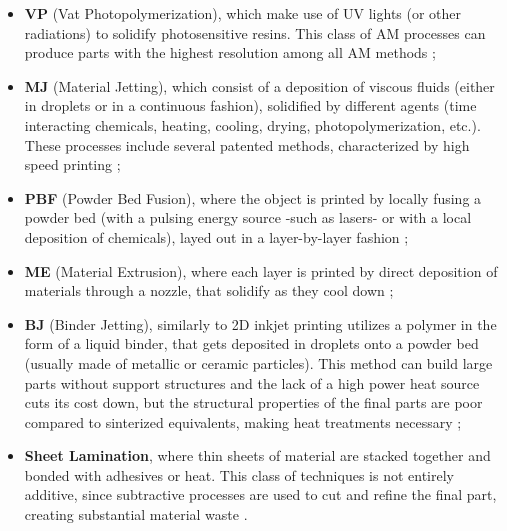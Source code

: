 \documentclass{article}
\begin{document}
    \begin{itemize}
        \item \textbf{VP} (Vat Photopolymerization), which make use of UV lights (or other radiations) to solidify photosensitive resins. This class of AM processes can produce 
                        parts with the highest resolution among all AM methods \autocites*{Recent_progress_polymers_AM}{Kovalcik_PHA_Review};
        \item \textbf{MJ} (Material Jetting), which consist of a deposition of viscous fluids (either in droplets or in a continuous fashion), solidified by different agents 
                            (time interacting chemicals, heating, cooling, drying, photopolymerization, etc.). These processes include several patented methods, characterized by 
                            high speed printing \autocite*{Recent_progress_polymers_AM};
        \item \textbf{PBF} (Powder Bed Fusion), where the object is printed by locally fusing a powder bed (with a pulsing energy source -such as lasers- or with a local deposition of chemicals),
                            layed out in a layer-by-layer fashion \autocites*{Recent_progress_polymers_AM}{Kovalcik_PHA_Review};
        \item \textbf{ME} (Material Extrusion), where each layer is printed by direct deposition of materials through a nozzle, that solidify as they cool down \autocites*{Recent_progress_polymers_AM}{Kovalcik_PHA_Review};
        \item \textbf{BJ} (Binder Jetting), similarly to 2D inkjet printing utilizes a
                        polymer in the form of a liquid binder, that gets deposited in droplets onto a powder bed (usually made of metallic or ceramic particles). This 
                        method can build large parts without support structures and the lack of a high power heat source cuts its cost down, but the structural 
                        properties of the final parts are poor compared to sinterized equivalents, making heat treatments necessary \autocite*{Recent_progress_polymers_AM};
        \item \textbf{Sheet Lamination}, where thin sheets of material are stacked together and bonded with adhesives or heat. This class of techniques 
                        is not entirely additive, since subtractive processes are used to cut and refine the final part, creating substantial material waste \autocite*{Recent_progress_polymers_AM}.
    \end{itemize} \clearpage
\end{document}
